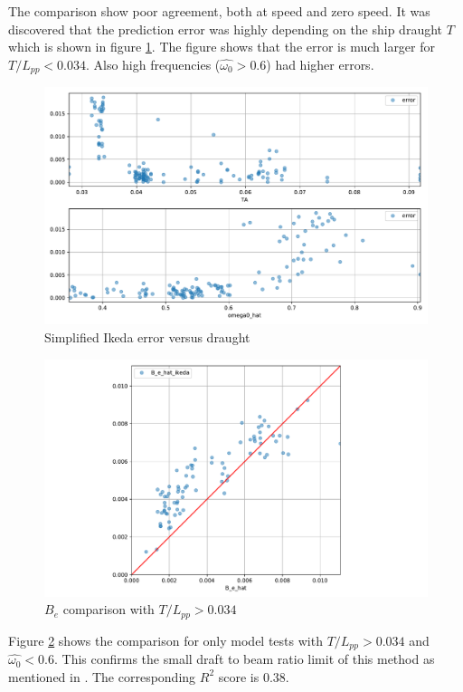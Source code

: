 The comparison show poor agreement, both at speed and zero speed. It was discovered that the prediction error was highly depending on the ship draught $T$ which is shown in figure  \ref{fig:B_e_hat_error}.
The figure shows that the error is much larger for $T/L_{pp}<0.034$. Also high frequencies ($\hat{\omega_0} > 0.6$) had higher errors.

\begin{figure}[H]
    \centering
    \includegraphics[width=\columnwidth]{figures/B_e_hat_error.pdf}
    \caption{Simplified Ikeda error versus draught}
    \label{fig:B_e_hat_error}
\end{figure}

\begin{figure}[H]
    \centering
    \includegraphics[width=\columnwidth]{figures/B_e_hat_good.pdf}
    \caption{$\hat{B_e}$ comparison with $T/L_{pp}>0.034$}
    \label{fig:B_e_hat_good}
\end{figure}

Figure \ref{fig:B_e_hat_good} shows the comparison for only model tests with $T/L_{pp}>0.034$ and $\hat{\omega_0} < 0.6$.
This confirms the small draft to beam ratio limit of this method as mentioned in \cite{kawahara_simple_2011}. The corresponding $R^2$ score is 0.38.

